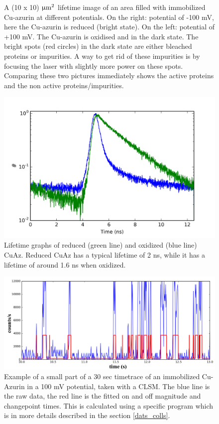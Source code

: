 \documentclass[twoside,single]{lion-msc}
\begin{document}
\begin{figure}
\begin{subfigure}{.5\textwidth}
  \label{}
\end{subfigure}
\caption{A  (10 x 10) $\upmu \textup{m}^{2}$  lifetime image of an area filled with immobilized Cu-azurin at different potentials. On the right: potential of -100 mV, here the Cu-azurin is reduced (bright state). On the left: potential of +100 mV. The Cu-azurin is oxidised and in the dark state. The bright spots (red circles) in the dark state are either bleached proteins or impurities. A way to get rid of these impurities is by focusing the laser with slightly more power on these spots. Comparing these two pictures immediately shows the active proteins and the non active proteins/impurities.}
\label{finding_proteins_1}
\end{figure}

\begin{figure}[ht!]
\centering
\includegraphics[width= .9 \textwidth]{lifetime.png}
\caption{Lifetime graphs of reduced (green line) and oxidized (blue line) CuAz. Reduced CuAz has a typical lifetime of 2 ns, while it has a lifetime of around 1.6 ns when oxidized.} 
\label{lifetime}
\end{figure}



\begin{figure}[ht!]
\centering
\includegraphics[width= \textwidth]{tt.png}
\caption{Example of a small part of a 30 sec timetrace of an immobilized Cu-Azurin in a 100 mV potential, taken with a CLSM. The blue line is the raw data, the red line is the fitted on and off magnitude and changepoint times. This is calculated using a specific program which is in more details described in the section \ref{dats_colls}.} 
\label{TT_exam}
\end{figure}
\end{document}

